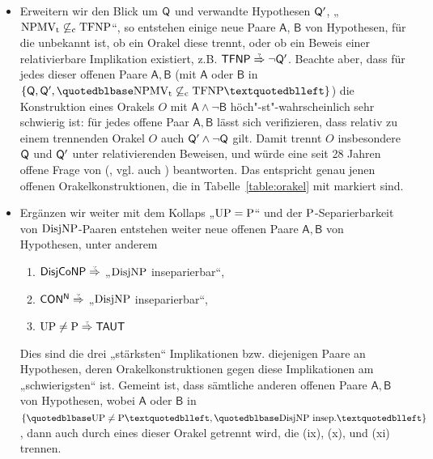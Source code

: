 \begin{itemize}[parsep=0pt,listparindent=\parindent,itemsep=5pt plus 1pt minus 1pt,midpenalty=0]
\item Erweitern wir den Blick um $\hQ$ und verwandte Hypothesen $\hQ'$, „$\NPMVt\not\subseteqc \TFNP$“, so entstehen einige neue Paare $\mathsf{A}$, $\mathsf{B}$ von Hypothesen, für die unbekannt ist, ob ein Orakel diese trennt, oder ob ein Beweis einer relativierbare Implikation existiert, z.B. $\hTFNP\stackrel{\smash{\text{\raisebox{-1pt}{\tiny ?}}}}{\Rightarrow}\neg\hQ'$. Beachte aber, dass für jedes dieser offenen Paare $\mathsf{A,B}$ (mit $\mathsf A$ oder $\mathsf B$ in $\{\hQ, \hQ', „\NPMVt\not\subseteqc \TFNP“\}$) die Konstruktion eines Orakels $O$ mit $\mathsf{A\land \neg B}$ höch"-st"-wahrscheinlich sehr schwierig ist: für jedes offene Paar $\mathsf{A,B}$ lässt sich verifizieren, dass relativ zu einem trennenden Orakel $O$ auch $\hQ'\land \neg \hQ$ gilt. Damit trennt $O$ insbesondere $\hQ$ und $\hQ'$ unter relativierenden Beweisen, und würde eine seit 28 Jahren offene Frage von \citeauthor{fenner_inverting_2003} (\citeyear{fenner_inverting_2003}, vgl. auch \citeyear{fenner_inverting_1996}) beantworten. Das entspricht genau jenen offenen Orakelkonstruktionen, die in Tabelle~\ref{table:orakel} mit \dag{} markiert sind.

    \item Ergänzen wir weiter mit dem Kollaps „$\UP=\P$“ und der $\P$-Separierbarkeit von $\DisjNP$-Paaren entstehen weiter neue offenen Paare $\mathsf{A,B}$ von Hypothesen, unter anderem
        \begin{enumerate}[noitemsep,resume,label=(\roman*)]
            \item $\hDisjCoNP\stackrel{\smash{\text{\raisebox{-1pt}{\tiny ?}}}}{\Rightarrow}$ „$\DisjNP$ inseparierbar“,
            \item $\mathsf{CON^N}\stackrel{\smash{\text{\raisebox{-1pt}{\tiny ?}}}}{\Rightarrow}$ „$\DisjNP$ inseparierbar“,
            \item $\UP\neq\P\stackrel{\smash{\text{\raisebox{-1pt}{\tiny ?}}}}{\Rightarrow} \hTAUT$
        \end{enumerate}
        Dies sind die drei „stärksten“ Implikationen bzw. diejenigen Paare an Hypothesen, deren Orakelkonstruktionen gegen diese Implikationen am „schwierigsten“ ist. Gemeint ist, dass sämtliche anderen offenen Paare $\mathsf{A,B}$ von Hypothesen, wobei $\mathsf{A}$ oder $\mathsf{B}$ in $\{„\UP\neq\P“, „\DisjNP\text{ insep.}“\}$, dann auch durch eines dieser Orakel getrennt wird, die (ix), (x), und (xi) trennen.


\end{itemize}
